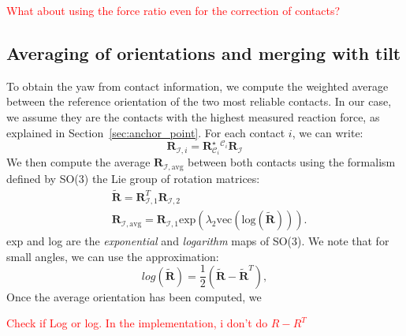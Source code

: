 \documentclass{IJCAS}
\begin{document}
\textcolor{red}{What about using the force ratio even for the correction of contacts?}
\subsection{Averaging of orientations and merging with tilt}

To obtain the yaw from contact information, we compute the weighted average between the reference orientation of the two most reliable contacts. In our case, we assume they are the contacts with the highest measured reaction force, as explained in Section~\ref{sec:anchor_point}. For each contact $i$, we can write:
\begin{equation}
    \boldsymbol{R}_{\mathcal{I}, i} = \boldsymbol{R}^{\star}_{\mathcal{C}_{i}} {}^{\mathcal{C}_{i}} \boldsymbol{R}_{\mathcal{I}} 
\end{equation}
We then compute the average $\boldsymbol{R}_{\mathcal{I}, \text{avg}}$ between both contacts using the formalism defined by SO(3) the Lie group of rotation matrices:
\begin{align}
    &\tilde{\boldsymbol{R}} = \boldsymbol{R}^{T}_{\mathcal{I}, 1} \boldsymbol{R}_{\mathcal{I}, 2}  \\
 & \boldsymbol{R}_{\mathcal{I}, \text{avg}} = \boldsymbol{R}_{\mathcal{I}, 1} \text{exp} \left( \lambda_{2} \text{vec}\left(\text{log} \left( \tilde{\boldsymbol{R}}\right)\right)  \right).
\end{align}
exp and log are the \emph{exponential} and \emph{logarithm} maps of SO(3). We note that for small angles, we can use the approximation:
\begin{equation}
log\left(\tilde{\boldsymbol{R}}\right) = \frac{1}{2} \left(\tilde{\boldsymbol{R}}-\tilde{\boldsymbol{R}}^{T}\right), \label{eq:log_small}
\end{equation}
Once the average orientation has been computed, we 


\textcolor{red}{Check if Log or log.}
\textcolor{red}{In the implementation, i don't do $R-R^T$}


\end{document}
